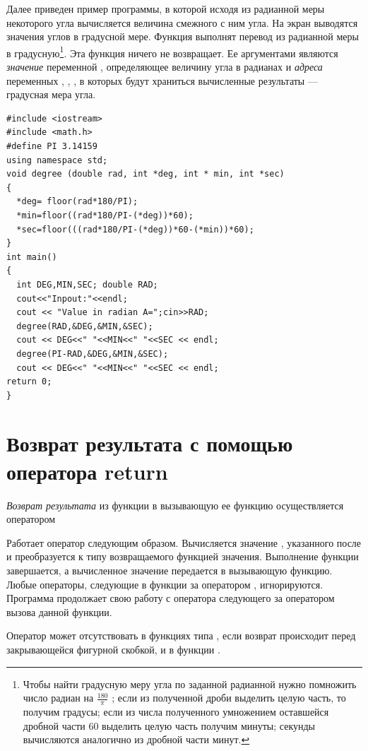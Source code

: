 Далее приведен пример программы, в которой исходя из радианной меры  некоторого угла вычисляется величина смежного с ним
угла. На экран выводятся значения углов в градусной мере. Функция  выполнят перевод из
радианной меры в градусную\footnote{Чтобы найти градусную меру угла по заданной радианной нужно помножить число радиан
на  $\frac{180}{\pi }$ ; если из полученной дроби выделить целую часть, то получим градусы; если из числа полученного
умножением оставшейся дробной части 60 выделить целую часть получим минуты; секунды вычисляются аналогично из дробной
части минут.}. Эта функция ничего не возвращает. Ее аргументами являются \emph{значение} переменной
, определяющее величину угла в радианах и \emph{адреса} переменных
, , , в которых будут храниться вычисленные
результаты --- градусная мера угла. 
\begin{lstlisting}
#include <iostream>
#include <math.h>
#define PI 3.14159
using namespace std;
void degree (double rad, int *deg, int * min, int *sec)
{
  *deg= floor(rad*180/PI);
  *min=floor((rad*180/PI-(*deg))*60);
  *sec=floor(((rad*180/PI-(*deg))*60-(*min))*60);
}
int main()
{
  int DEG,MIN,SEC; double RAD;
  cout<<"Inpout:"<<endl;
  cout << "Value in radian A=";cin>>RAD;
  degree(RAD,&DEG,&MIN,&SEC);
  cout << DEG<<" "<<MIN<<" "<<SEC << endl;
  degree(PI-RAD,&DEG,&MIN,&SEC);
  cout << DEG<<" "<<MIN<<" "<<SEC << endl;
return 0;
}
\end{lstlisting}

\section[Возврат результата с помощью оператора return]{Возврат результата с помощью оператора return}
\emph{Возврат результата} из функции в вызывающую ее функцию
осуществляется оператором


Работает оператор следующим образом. Вычисляется значение , указанного после
 и преобразуется к типу возвращаемого функцией значения. Выполнение функции завершается, а
вычисленное значение передается в вызывающую функцию. Любые операторы, следующие в функции за оператором
, игнорируются. Программа продолжает свою работу с оператора следующего за оператором вызова
данной функции.

Оператор  может отсутствовать в функциях типа , если возврат происходит
перед закрывающейся фигурной скобкой, и в функции .

